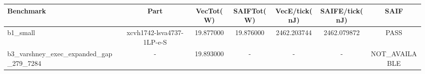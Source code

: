\begin{tabular}{lcccccc}
\hline
Benchmark & Part & VecTot(W) & SAIFTot(W) & VecE/tick(nJ) & SAIFE/tick(nJ) & SAIF \\
\hline
b1\_small & xcvh1742-lsva4737-1LP-e-S & 19.877000 & 19.876000 & 2462.203744 & 2462.079872 & PASS \\
b3\_varshney\_exec\_expanded\_gap\_279\_7284 & - & 19.893000 & - & - & - & NOT\_AVAILABLE \\
\hline
\end{tabular}
